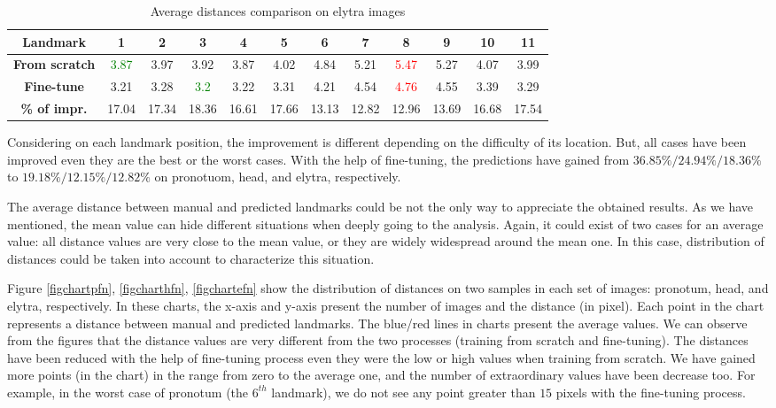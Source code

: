 \documentclass[review]{elsarticle}
\begin{document}
\begin{table}[h!]
	\centering
	\begin{tabular}{| c | c | c | c | c | c | c | c | c | c | c | c |}
		\hline
		\textbf{Landmark} & 1 & 2 & 3 & 4 & 5 & 6 & 7 & 8 & 9 & 10 & 11 \\ \hline
		\textbf{From scratch} & \textcolor{green}{3.87} & 3.97 & 3.92 & 3.87 & 4.02 & 4.84 & 5.21 & \textcolor{red}{5.47} & 5.27 & 4.07 & 3.99 \\ \hline
		\textbf{Fine-tune} & 3.21 & 3.28 & \textcolor{green}{3.2} & 3.22 & 3.31 & 4.21 & 4.54 & \textcolor{red}{4.76} & 4.55 & 3.39 & 3.29 \\ \hline
		\textbf{\% of impr.} & 17.04 & 17.34 & 18.36 & 16.61 & 17.66 & 13.13 & 12.82 & 12.96 & 13.69 & 16.68 & 17.54 \\ \hline
	\end{tabular}
	\caption{Average distances comparison on elytra images}
	\label{tblfn_elytra}
\end{table}

Considering on each landmark position, the improvement is different depending on the difficulty of its location. But, all cases have been improved even they are the best or the worst cases. With the help of fine-tuning, the predictions have gained from $36.85\%/ 24.94\%/ 18.36\%$ to $19.18\%/ 12.15\%/ 12.82\%$ on pronotuom, head, and elytra, respectively.

The average distance between manual and predicted landmarks could be not the only way to appreciate the obtained results. As we have mentioned, the mean value can hide different situations when deeply going to the analysis. Again, it could exist of two cases for an average value: all distance values are very close to the mean value, or they are widely widespread around the mean one. In this case, distribution of distances could be taken into account to characterize this situation.

Figure \ref{figchartpfn}, \ref{figcharthfn}, \ref{figchartefn} show the distribution of distances on two samples in each set of images: pronotum, head, and elytra, respectively. In these charts, the x-axis and y-axis present the number of images and the distance (in pixel). Each point in the chart represents a distance between manual and predicted landmarks. The blue/red lines in charts present the average values. We can observe from the figures that the distance values are very different from the two processes (training from scratch and fine-tuning). The distances have been reduced with the help of fine-tuning process even they were the low or high values when training from scratch. We have gained more points (in the chart) in the range from zero to the average one, and the number of extraordinary values have been decrease too. For example, in the worst case of pronotum (the $6^{th}$ landmark), we do not see any point greater than $15$ pixels with the fine-tuning process.
\end{document}
